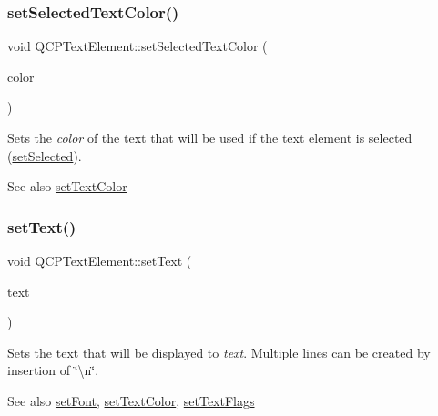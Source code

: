 \subsubsection{\texorpdfstring{set\+Selected\+Text\+Color()}{setSelectedTextColor()}}
{\footnotesize\ttfamily void Q\+C\+P\+Text\+Element\+::set\+Selected\+Text\+Color (\begin{DoxyParamCaption}\item[{const Q\+Color \&}]{color }\end{DoxyParamCaption})}

Sets the {\itshape color} of the text that will be used if the text element is selected (\hyperlink{class_q_c_p_text_element_aba5521f9fb22a5f3d2f09ab37d4a1751}{set\+Selected}).

\begin{DoxySeeAlso}{See also}
\hyperlink{class_q_c_p_text_element_a4f3b8361c3ffb3f84346954929ce93ba}{set\+Text\+Color} 
\end{DoxySeeAlso}
\mbox{\label{class_q_c_p_text_element_ac44b81e69e719b879eb2feecb33557e2}} 
\subsubsection{\texorpdfstring{set\+Text()}{setText()}}
{\footnotesize\ttfamily void Q\+C\+P\+Text\+Element\+::set\+Text (\begin{DoxyParamCaption}\item[{const Q\+String \&}]{text }\end{DoxyParamCaption})}

Sets the text that will be displayed to {\itshape text}. Multiple lines can be created by insertion of \char`\"{}\textbackslash{}n\char`\"{}.

\begin{DoxySeeAlso}{See also}
\hyperlink{class_q_c_p_text_element_a09b3241769528fa87cb4bf35c97defad}{set\+Font}, \hyperlink{class_q_c_p_text_element_a4f3b8361c3ffb3f84346954929ce93ba}{set\+Text\+Color}, \hyperlink{class_q_c_p_text_element_ab908f437f552020888a3ad8cf8242605}{set\+Text\+Flags} 
\end{DoxySeeAlso}
\mbox{\label{class_q_c_p_text_element_a4f3b8361c3ffb3f84346954929ce93ba}} 
